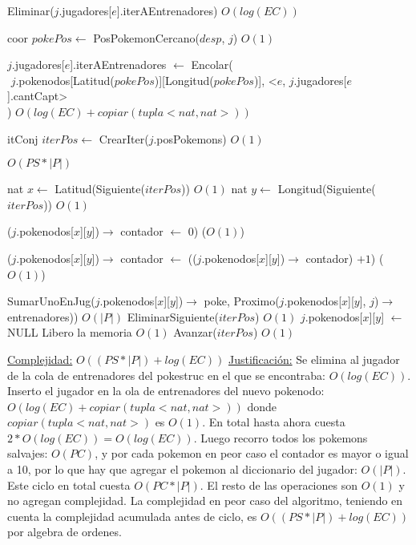 \begin{Algoritmos}
\begin{algorithmic}[1]
$ $\newline

\State Eliminar($j$.jugadores[$e$].iterAEntrenadores) \Comment $O(log(EC))$

\State coor $pokePos \gets$ PosPokemonCercano($desp$, $j$) \Comment $O(1)$

\State $j$.jugadores[$e$].iterAEntrenadores $\gets$ Encolar(\\
$   $\hspace*{2cm}  $j$.pokenodos[Latitud($pokePos$)][Longitud($pokePos$)], <$e$, $j$.jugadores[$e$].cantCapt>\\
$   $\hspace*{1cm}) \Comment $O(log(EC) + copiar(tupla <nat, nat>))$


\State itConj $iterPos \gets$ CrearIter($j$.posPokemons) \Comment $O(1)$ 

 \Comment $O(PS * |P|)$

  \State nat $x \gets$ Latitud(Siguiente($iterPos$)) \Comment $O(1)$
  \State nat $y \gets$ Longitud(Siguiente($iterPos$)) \Comment $O(1)$   

    \State ($j$.pokenodos[$x$][$y$])$\rightarrow$ contador $\gets$ 0) \Comment($O(1)$)
  \EndIf

  
  \State ($j$.pokenodos[$x$][$y$])$\rightarrow$ contador $\gets$ (($j$.pokenodos[$x$][$y$])$\rightarrow$ contador) $+ 1$) \Comment($O(1)$)
  
    \State SumarUnoEnJug($j$.pokenodos[$x$][$y$])$\rightarrow$ poke, Proximo($j$.pokenodos[$x$][$y$], $j$)$\rightarrow$ entrenadores)) \Comment $O(|P|)$
    \State EliminarSiguiente($iterPos$) \Comment $O(1)$
    \State $j$.pokenodos[$x$][$y$] $\gets$ NULL \Comment Libero la memoria $O(1)$
  \Else 
    \State Avanzar($iterPos$) \Comment $O(1)$ 
  \EndIf

\EndWhile 



\medskip
\Statex \underline{Complejidad:} $O((PS *|P|) + log(EC))$ 
\Statex \underline{Justificaci\'on:} Se elimina al jugador de la cola de entrenadores del pokestruc en el que se encontraba: $O(log(EC))$. Inserto el jugador en la ola de entrenadores del nuevo pokenodo: $O(log(EC) + copiar(tupla <nat, nat>))$ donde $copiar(tupla <nat, nat>)$ es $O(1)$. En total hasta ahora cuesta $2*O(log(EC)) = O(log(EC))$. Luego recorro todos los pokemons salvajes: $O(PC)$, y por cada pokemon en peor caso el contador es mayor o igual a 10, por lo que hay que agregar el pokemon al diccionario del jugador: $O(|P|)$. Este ciclo en total cuesta $O(PC*|P|)$. El resto de las operaciones son $O(1)$ y no agregan complejidad. La complejidad en peor caso del algoritmo, teniendo en cuenta la complejidad acumulada antes de ciclo, es $O((PS *|P|) + log(EC))$ por algebra de ordenes.
\end{algorithmic}


\end{Algoritmos}
